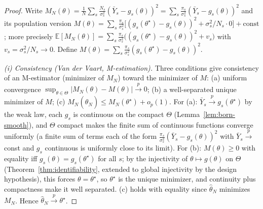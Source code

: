 \documentclass[aps,prxquantum,reprint,superscriptaddress,nofootinbib,amsmath,amssymb]{revtex4-2}
\newcommand{\abs}[1]{\left\lvert #1 \right\rvert}
\begin{document}
\begin{proof}
Write $M_N(\theta)=\tfrac1N\sum_s\tfrac{N_s}{\sigma_s^2}(\bar Y_s-g_s(\theta))^2=\sum_s\tfrac{\pi_s}{\sigma_s^2}(\bar Y_s-g_s(\theta))^2$ and its population version $M(\theta)=\sum_s\tfrac{\pi_s}{\sigma_s^2}\bigl[(g_s(\theta^\star)-g_s(\theta))^2+\sigma_s^2/N_s\cdot 0\bigr]+\text{const}$; more precisely $\mathbb{E}[M_N(\theta)]=\sum_s\tfrac{\pi_s}{\sigma_s^2}\bigl((g_s(\theta^\star)-g_s(\theta))^2+v_s\bigr)$ with $v_s=\sigma_s^2/N_s\to0$. Define $M(\theta)=\sum_s\tfrac{\pi_s}{\sigma_s^2}(g_s(\theta^\star)-g_s(\theta))^2$.

\emph{(i) Consistency (Van der Vaart, M-estimation).} Three conditions give consistency of an M-estimator (minimizer of $M_N$) toward the minimizer of $M$: (a) uniform convergence $\sup_{\theta\in\Theta}\abs{M_N(\theta)-M(\theta)}\xrightarrow{p}0$; (b) a well-separated unique minimizer of $M$; (c) $M_N(\hat\theta_N)\leq M_N(\theta^\star)+o_p(1)$. For (a): $\bar Y_s\xrightarrow{p}g_s(\theta^\star)$ by the weak law, each $g_s$ is continuous on the compact $\Theta$ (Lemma~\ref{lem:born-smooth}), and $\Theta$ compact makes the finite sum of continuous functions converge uniformly (a finite sum of terms each of the form $\tfrac{\pi_s}{\sigma_s^2}(\bar Y_s-g_s(\theta))^2$ with $\bar Y_s\xrightarrow{p}$const and $g_s$ continuous is uniformly close to its limit). For (b): $M(\theta)\geq0$ with equality iff $g_s(\theta)=g_s(\theta^\star)$ for all $s$; by the injectivity of $\theta\mapsto g(\theta)$ on $\Theta$ (Theorem~\ref{thm:identifiability}, extended to global injectivity by the design hypothesis), this forces $\theta=\theta^\star$, so $\theta^\star$ is the unique minimizer, and continuity plus compactness make it well separated. (c) holds with equality since $\hat\theta_N$ minimizes $M_N$. Hence $\hat\theta_N\xrightarrow{p}\theta^\star$.


\end{proof}
\end{document}
